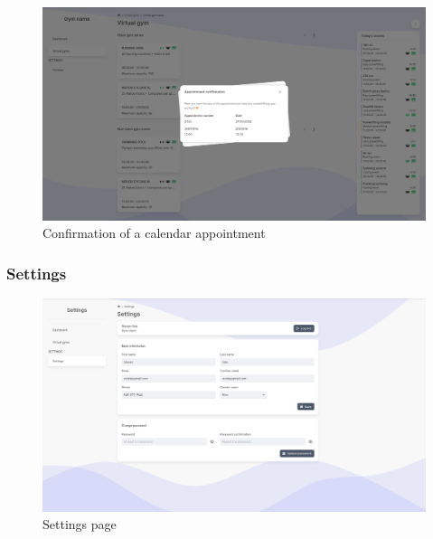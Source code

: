 \documentclass[a4paper, 12pt, oneside]{book}
\begin{document}
\begin{figure}[H]
	\centering
	\includegraphics[width=\textwidth]{assets/client-screenshots/calendar-appointment-created.png}
	\caption{Confirmation of a calendar appointment}
\end{figure}
\subsubsection{Settings}
\begin{figure}[H]
	\centering
	\includegraphics[width=\textwidth]{assets/client-screenshots/settings.png}
	\caption{Settings page}
\end{figure}
\end{document}
